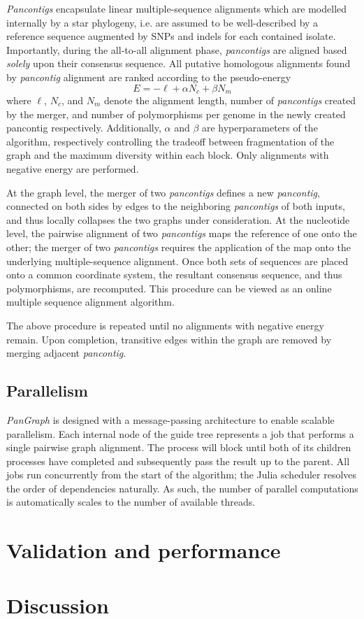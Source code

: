 \documentclass[aps,rmp,reprint,superscriptaddress,notitlepage,10pt]{revtex4-1}
\begin{document}
\emph{Pancontigs} encapsulate linear multiple-sequence alignments which are modelled internally by a star phylogeny, i.e. are assumed to be well-described by a reference sequence augmented by SNPs and indels for each contained isolate.
Importantly, during the all-to-all alignment phase, \emph{pancontigs} are aligned based \emph{solely} upon their consensus sequence.
All putative homologous alignments found by \emph{pancontig} alignment are ranked according to the pseudo-energy
\begin{equation}
    E = -\ell + \alpha N_c + \beta N_m
\end{equation}
where $\ell$, $N_c$, and $N_m$ denote the alignment length, number of \emph{pancontigs} created by the merger, and number of polymorphisms per genome in the newly created {pancontig} respectively.
Additionally, $\alpha$ and $\beta$ are hyperparameters of the algorithm, respectively controlling the tradeoff between fragmentation of the graph and the maximum diversity within each block.
Only alignments with negative energy are performed.

At the graph level, the merger of two \emph{pancontigs} defines a new \emph{pancontig}, connected on both sides by edges to the neighboring \emph{pancontigs} of both inputs, and thus locally collapses the two graphs under consideration.
At the nucleotide level, the pairwise alignment of two \emph{pancontigs} maps the reference of one onto the other; the merger of two \emph{pancontigs} requires the application of the map onto the underlying multiple-sequence alignment.
Once both sets of sequences are placed onto a common coordinate system, the resultant consensus sequence, and thus polymorphisms, are recomputed.
This procedure can be viewed as an online multiple sequence alignment algorithm.

The above procedure is repeated until no alignments with negative energy remain.
Upon completion, transitive edges within the graph are removed by merging adjacent \emph{pancontig}.

\subsection{Parallelism}
\emph{PanGraph} is designed with a message-passing architecture to enable scalable parallelism.
Each internal node of the guide tree represents a job that performs a single pairwise graph alignment.
The process will block until both of its children processes have completed and subsequently pass the result up to the parent.
All jobs run concurrently from the start of the algorithm; the Julia scheduler resolves the order of dependencies naturally.
As such, the number of parallel computations is automatically scales to the number of available threads.

\section{Validation and performance}
\section{Discussion}

{}
\end{document}
